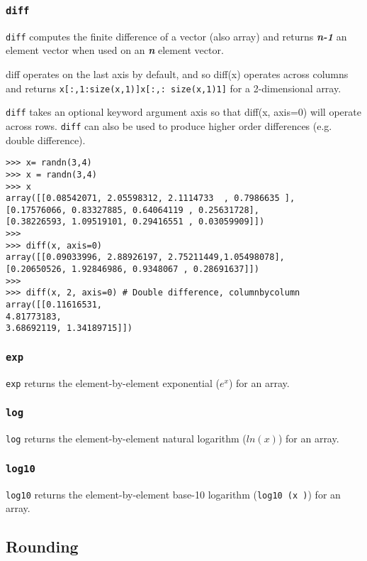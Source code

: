\documentclass[KSmain.tex]{subfiles}
\begin{document}
\subsubsection*{\texttt{diff}}
\texttt{diff} computes the finite difference of a vector (also array) and returns \textbf{\textit{n-1}} an element vector when used on
an \textbf{\textit{n}} element vector. 

\noindent diff operates on the last axis by default, and so diff(x) operates across columns and
returns \texttt{x[:,1:size(x,1)]x[:,:
size(x,1)1]}
for a 2-dimensional array. 

\texttt{diff} takes an optional keyword argument axis so that diff(x, axis=0) will operate across rows. \texttt{diff} can also be used to produce higher
order differences (e.g. double difference).
\begin{framed}
\begin{verbatim}>>> x= randn(3,4)
>>> x = randn(3,4)
>>> x
array([[0.08542071, 2.05598312, 2.1114733  , 0.7986635 ],
[0.17576066, 0.83327885, 0.64064119 , 0.25631728],
[0.38226593, 1.09519101, 0.29416551 , 0.03059909]])
>>>
>>> diff(x, axis=0)
array([[0.09033996, 2.88926197, 2.75211449,1.05498078],
[0.20650526, 1.92846986, 0.9348067 , 0.28691637]])
>>>
>>> diff(x, 2, axis=0) # Double difference, columnbycolumn
array([[0.11616531,
4.81773183,
3.68692119, 1.34189715]])
\end{verbatim}
\end{framed}
\subsubsection*{\texttt{exp}}
\texttt{exp} returns the element-by-element exponential ($e^x$) for an array.
\subsubsection*{\texttt{log}}
\texttt{log} returns the element-by-element natural logarithm ($ln(x )$) for an array.
\subsubsection*{\texttt{log10}}
\texttt{log10} returns the element-by-element base-10 logarithm (\texttt{log10 (x )}) for an array.

\subsection{Rounding}
\end{document}
